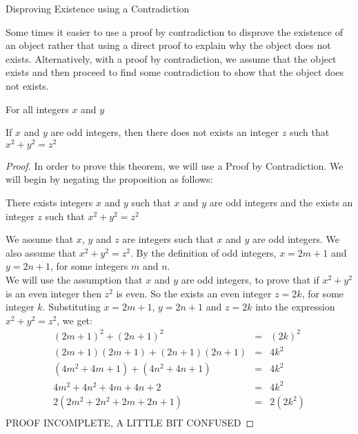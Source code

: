\begin{definition}
Disproving Existence using a Contradiction

Some times it easier to use a proof by contradiction to disprove the existence of an object rather that using a direct proof to explain why the object does not exists. Alternatively, with a proof by contradiction, we assume that the object exists and then proceed to find some contradiction to show that the object does not exists. 

\begin{example}
For all integers $x$ and $y$
\begin{tcolorbox}
	\begin{theorem}
	\label{the2}		
		If $x$ and $y$ are odd integers, then there does not exists an integer $z$ such that $x^2 + y^2 = z^2$ 
	\end{theorem}
\end{tcolorbox}

\begin{proof}
In order to prove this theorem, we will use a Proof by Contradiction. We will begin by negating the proposition as follows:  
	\begin{center}
		There exists integers $x$ and $y$ such that $x$ and $y$ are odd integers and the exists an integer $z$ such that $x^2 + y^2 = z^2$
	\end{center}

We assume that $x$, $y$ and $z$ are integers such that $x$ and $y$ are odd integers. We also assume that $x^2 + y^2 = z^2$. By the definition of odd integers, $x = 2m + 1$ and $y = 2n + 1$, for some integers $m$ and $n$. \\
We will use the assumption that $x$ and $y$ are odd integers, to prove that if $x^2 + y^2$ is an even integer then $z^2$ is even. So the exists an even integer $z =2k$, for some integer $k$. Substituting $x = 2m + 1$, $y = 2n + 1$ and $z = 2k$ into the expression $x^2 + y^2 = z^2$, we get: 
	\begin{eqnarray*}
		(2m + 1)^2 + (2n + 1)^2 & = & (2k)^2 \nonumber \\
		(2m + 1)(2m + 1) + (2n + 1)(2n + 1) & = & 4k^2 \nonumber \\
		(4m^2 + 4m + 1) + (4n^2 + 4n + 1) & = & 4k^2 \nonumber \\
		4m^2 + 4n^2 + 4m + 4n + 2 & = & 4k^2 \nonumber \\
		2(2m^2 + 2n^2 + 2m + 2n + 1) & = & 2(2k^2)\nonumber \\
	\end{eqnarray*}
PROOF INCOMPLETE, A LITTLE BIT CONFUSED


 

\end{proof}

\
\end{example}


\end{definition}












